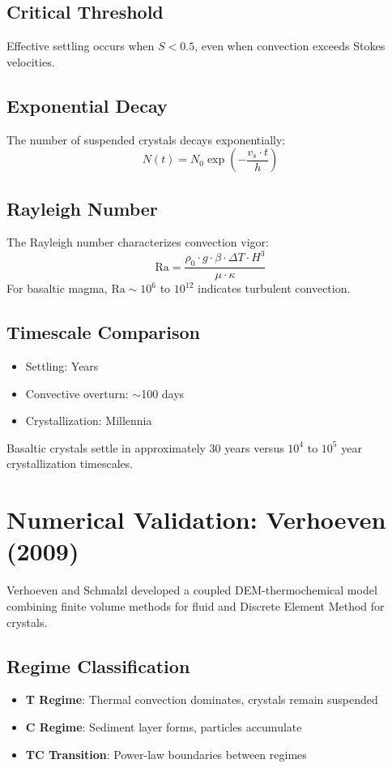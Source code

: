 \subsection{Critical Threshold}
Effective settling occurs when $S < 0.5$, even when convection exceeds Stokes velocities.

\subsection{Exponential Decay}
The number of suspended crystals decays exponentially:
\begin{equation}
N(t) = N_0 \exp\left(-\frac{v_s \cdot t}{h}\right)
\end{equation}

\subsection{Rayleigh Number}
The Rayleigh number characterizes convection vigor:
\begin{equation}
\text{Ra} = \frac{\rho_0 \cdot g \cdot \beta \cdot \Delta T \cdot H^3}{\mu \cdot \kappa}
\end{equation}
For basaltic magma, $\text{Ra} \sim 10^6$ to $10^{12}$ indicates turbulent convection.

\subsection{Timescale Comparison}
\begin{itemize}
    \item Settling: Years
    \item Convective overturn: $\sim$100 days
    \item Crystallization: Millennia
\end{itemize}
Basaltic crystals settle in approximately 30 years versus $10^4$ to $10^5$ year crystallization timescales.

\section{Numerical Validation: Verhoeven (2009)}

Verhoeven and Schmalzl \cite{verhoeven2009} developed a coupled DEM-thermochemical model combining finite volume methods for fluid and Discrete Element Method for crystals.

\subsection{Regime Classification}
\begin{itemize}
    \item \textbf{T Regime}: Thermal convection dominates, crystals remain suspended
    \item \textbf{C Regime}: Sediment layer forms, particles accumulate
    \item \textbf{TC Transition}: Power-law boundaries between regimes
\end{itemize}

